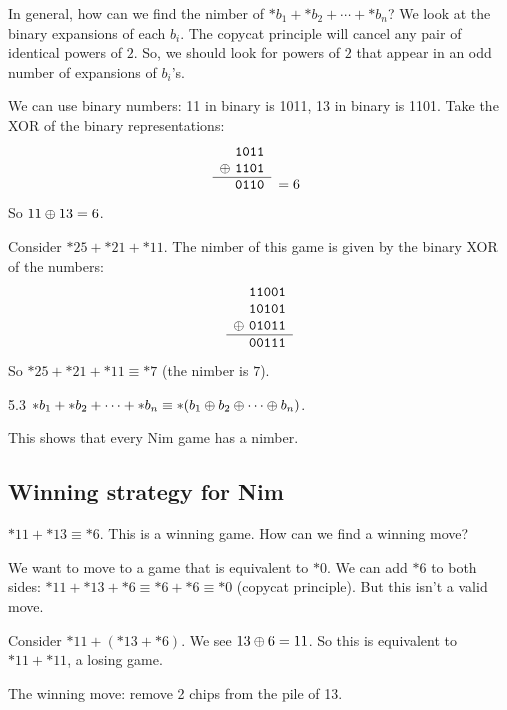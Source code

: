 \documentclass[12pt,letterpaper]{report}
\begin{document}
In general, how can we find the nimber of $*b_1 + *b_2 + \cdots + *b_n$?
We look at the binary expansions of each $b_i$.
The copycat principle will cancel any pair of identical powers of $2$.
So, we should look for powers of $2$ that appear in an odd number of expansions of $b_i$'s.

We can use binary numbers: 11 in binary is 1011, 13 in binary is 1101.
Take the XOR of the binary representations:
\[
  \begin{array}{r r}
    \texttt{1011} & \\
    \xor\ \texttt{1101} & \\
    \cline{1-1}
    \texttt{0110} & = 6 \\
  \end{array}
\]
So $11 \oplus 13 = 6$.

\begin{ex}
  Consider $*25 + *21 + *11$.
  The nimber of this game is given by the binary XOR of the numbers:
  \[
    \begin{array}{r}
      \texttt{11001} \\
      \texttt{10101} \\
      \oplus\ \texttt{01011} \\
      \hline
      \texttt{00111} \\
    \end{array}
  \]
  So $*25 + *21 + *11 \equiv *7$ (the nimber is $7$).
\end{ex}

\begin{cor}{}{5.3}
  $*b_1 + *b_2 + \cdots + *b_n \equiv *(b_1 \oplus b_2 \oplus \cdots \oplus b_n)$.
\end{cor}

This shows that every Nim game has a nimber.

\pagebreak
\subsection{Winning strategy for Nim}

\begin{ex}
  $*11 + *13 \equiv *6$.
  This is a winning game.
  How can we find a winning move?

  We want to move to a game that is equivalent to $*0$.
  We can add $*6$ to both sides: $*11 + *13 + *6 \equiv *6 + *6 \equiv *0$ (copycat principle).
  But this isn't a valid move.

  Consider $*11 + (*13 + *6)$.
  We see $13 \oplus 6 = 11$.
  So this is equivalent to $*11 + *11$, a losing game.

  The winning move: remove 2 chips from the pile of 13.
\end{ex}
\end{document}
